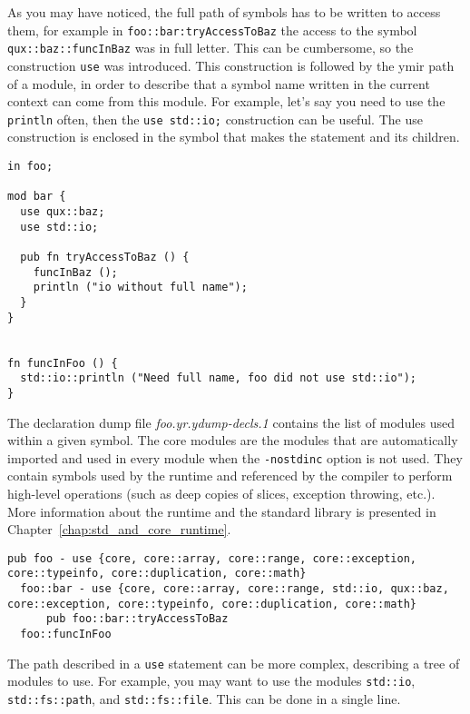 As you may have noticed, the full path of symbols has to be written to access
them, for example in \texttt{foo::bar:tryAccessToBaz} the access to the symbol
\texttt {qux::baz::funcInBaz} was in full letter. This can be cumbersome, so the
construction \texttt{use} was introduced. This construction is followed by the
ymir path of a module, in order to describe that a symbol name written in the
current context can come from this module. For example, let's say you need to
use the \texttt{println} often, then the \texttt{use std::io;} construction can
be useful. The use construction is enclosed in the symbol that makes the
statement and its children.

\begin{lstlisting}[caption=\textit{./foo.yr}, style=coloredverbatim]
in foo;

mod bar {
  use qux::baz;
  use std::io;

  pub fn tryAccessToBaz () {
    funcInBaz ();
    println ("io without full name");
  }
}


fn funcInFoo () {
  std::io::println ("Need full name, foo did not use std::io");
}
\end{lstlisting}

The declaration dump file \textit{foo.yr.ydump-decls.1} contains the list of
modules used within a given symbol. The core modules are the modules that are
automatically imported and used in every module when the \texttt{-nostdinc}
option is not used. They contain symbols used by the runtime and referenced by
the compiler to perform high-level operations (such as deep copies of slices,
exception throwing, etc.). More information about the runtime and the standard
library is presented in Chapter~\ref{chap:std_and_core_runtime}.

\begin{minipage}{\linewidth}
\begin{lstlisting}[caption=\textit{foo.yr.ydump-decls.1}, style=intermediateVerb]
pub foo - use {core, core::array, core::range, core::exception, core::typeinfo, core::duplication, core::math}
  foo::bar - use {core, core::array, core::range, std::io, qux::baz, core::exception, core::typeinfo, core::duplication, core::math}
      pub foo::bar::tryAccessToBaz
  foo::funcInFoo
\end{lstlisting}
\end{minipage}

The path described in a \texttt{use} statement can be more complex, describing a
tree of modules to use. For example, you may want to use the modules
\texttt{std::io}, \texttt{std::fs::path}, and \texttt{std::fs::file}. This can
be done in a single line.


